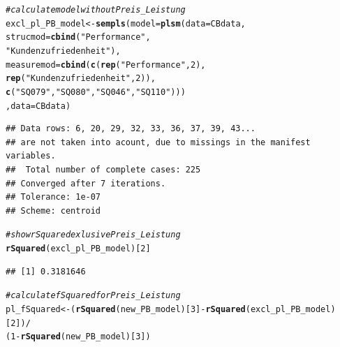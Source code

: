 \documentclass{article}\usepackage[]{graphicx}\usepackage[]{color}
\makeatletter
\newcommand{\hlnum}[1]{\textcolor[rgb]{0.686,0.059,0.569}{#1}}%
\newcommand{\hlstr}[1]{\textcolor[rgb]{0.192,0.494,0.8}{#1}}%
\newcommand{\hlcom}[1]{\textcolor[rgb]{0.678,0.584,0.686}{\textit{#1}}}%
\newcommand{\hlopt}[1]{\textcolor[rgb]{0,0,0}{#1}}%
\newcommand{\hlstd}[1]{\textcolor[rgb]{0.345,0.345,0.345}{#1}}%
\newcommand{\hlkwb}[1]{\textcolor[rgb]{0.69,0.353,0.396}{#1}}%
\newcommand{\hlkwc}[1]{\textcolor[rgb]{0.333,0.667,0.333}{#1}}%
\newcommand{\hlkwd}[1]{\textcolor[rgb]{0.737,0.353,0.396}{\textbf{#1}}}%
\newenvironment{kframe}{%
 \def\at@end@of@kframe{}%
 \ifinner\ifhmode%
  \def\at@end@of@kframe{\end{minipage}}%
  \begin{minipage}{\columnwidth}%
 \fi\fi%
 \def\FrameCommand##1{\hskip\@totalleftmargin \hskip-\fboxsep
 \colorbox{shadecolor}{##1}\hskip-\fboxsep
     \hskip-\linewidth \hskip-\@totalleftmargin \hskip\columnwidth}%
 \MakeFramed {\advance\hsize-\width
   \@totalleftmargin\z@ \linewidth\hsize
   \@setminipage}}%
 {\par\unskip\endMakeFramed%
 \at@end@of@kframe}
\newenvironment{knitrout}{}{} %
\makeatother
\begin{document}
\begin{knitrout}
\color{fgcolor}\begin{kframe}
\begin{alltt}
\hlcom{#calculate model without Preis_Leistung}
\hlstd{excl_pl_PB_model} \hlkwb{<-} \hlkwd{sempls}\hlstd{(}\hlkwc{model} \hlstd{=} \hlkwd{plsm}\hlstd{(}\hlkwc{data} \hlstd{= CBdata,}
                \hlkwc{strucmod} \hlstd{=} \hlkwd{cbind}\hlstd{(}\hlstr{"Performance"}\hlstd{,}
                                 \hlstr{"Kundenzufriedenheit"}\hlstd{),}
                \hlkwc{measuremod} \hlstd{=} \hlkwd{cbind}\hlstd{(}\hlkwd{c}\hlstd{(}\hlkwd{rep}\hlstd{(}\hlstr{"Performance"}\hlstd{,}\hlnum{2}\hlstd{),}
                                     \hlkwd{rep}\hlstd{(}\hlstr{"Kundenzufriedenheit"}\hlstd{,}\hlnum{2}\hlstd{)),}
                                   \hlkwd{c}\hlstd{(}\hlstr{"SQ079"}\hlstd{,}\hlstr{"SQ080"}\hlstd{,}\hlstr{"SQ046"}\hlstd{,}\hlstr{"SQ110"}\hlstd{)))}
                \hlstd{,}\hlkwc{data} \hlstd{= CBdata)}
\end{alltt}
\begin{verbatim}
## Data rows: 6, 20, 29, 32, 33, 36, 37, 39, 43...
## are not taken into acount, due to missings in the manifest variables.
##  Total number of complete cases: 225 
## Converged after 7 iterations.
## Tolerance: 1e-07
## Scheme: centroid
\end{verbatim}
\begin{alltt}
\hlcom{#show rSquared exlusive Preis_Leistung}
\hlkwd{rSquared}\hlstd{(excl_pl_PB_model)[}\hlnum{2}\hlstd{]}
\end{alltt}
\begin{verbatim}
## [1] 0.3181646
\end{verbatim}
\begin{alltt}
\hlcom{#calculate fSquared for Preis_Leistung  }
\hlstd{pl_fSquared} \hlkwb{<-}   \hlstd{(}\hlkwd{rSquared}\hlstd{(new_PB_model)[}\hlnum{3}\hlstd{]}\hlopt{-}\hlkwd{rSquared}\hlstd{(excl_pl_PB_model)[}\hlnum{2}\hlstd{])}\hlopt{/}
                  \hlstd{(}\hlnum{1}\hlopt{-}\hlkwd{rSquared}\hlstd{(new_PB_model)[}\hlnum{3}\hlstd{])}


\end{alltt}
\end{kframe}
\end{knitrout}
\end{document}
